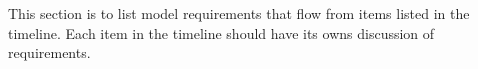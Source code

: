 This section is to list model requirements that flow from items listed in the timeline. Each item in the timeline should have its owns discussion of requirements.